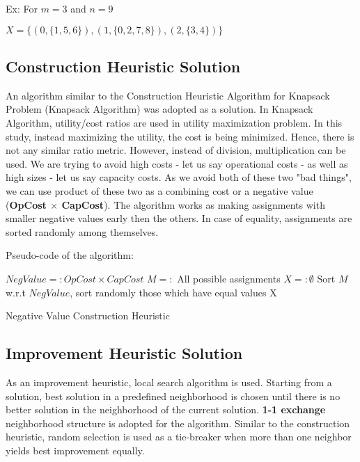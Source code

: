 \documentclass[11pt]{article}
\begin{document}
Ex: For $m = 3$ and $n=9$

$X = \{ (0,\{1,5,6\}), (1,\{0,2,7,8  \}), (2,\{3,4  \}) \}  $

\pagebreak
    \hypertarget{const}{%
\subsection{Construction Heuristic Solution}\label{const}}


An algorithm similar to the Construction Heuristic Algorithm for Knapsack Problem (Knapsack Algorithm) was adopted as a solution. In Knapsack Algorithm, utility/cost ratios are used in utility maximization problem. In this study, instead maximizing the utility, the cost is being minimized. Hence, there is not any similar ratio metric. However, instead of division, multiplication can be used. We are trying to avoid high costs - let us say operational costs - as well as high sizes - let us say capacity costs. As we avoid both of these two "bad things", we can use product of these two as a combining cost or a negative value (\textbf{OpCost $\times$ CapCost}). The algorithm works as making assignments with smaller negative values early then the others. In case of equality, assignments are sorted randomly among themselves.




Pseudo-code of the algorithm:




\begin{algorithm}[H]
\SetAlgoLined
 $NegValue =: OpCost \times CapCost$\;
 $M =:$ All possible assignments\;
 $X =: \emptyset $\;
 Sort $M$ w.r.t $NegValue$, sort randomly those which have equal values\;
 \Return X
 \caption{Negative Value Construction Heuristic}
\end{algorithm}

\pagebreak
    \hypertarget{imprv}{%
\subsection{Improvement Heuristic Solution}\label{imprv}}

As an improvement heuristic, local search algorithm is used. Starting from a solution, best solution in a predefined neighborhood is chosen until there is no better solution in the neighborhood of the current solution. \textbf{1-1 exchange} neighborhood structure is adopted for the algorithm. Similar to the construction heuristic, random selection is used as a tie-breaker when more than one neighbor yields best improvement equally.
\end{document}
